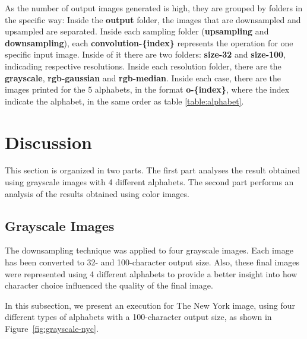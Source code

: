 \documentclass[]{IEEEtran}
\begin{document}
As the number of output images generated is high, they are grouped by folders in the specific way: Inside the \textbf{output} folder, the images that are downsampled and upsampled are separated. Inside each sampling folder (\textbf{upsampling} and \textbf{downsampling}), each \textbf{convolution-\{index\}} represents the operation for one specific input image. Inside of it there are two folders: \textbf{size-32} and \textbf{size-100}, indicading respective resolutions. Inside each resolution folder, there are the \textbf{grayscale}, \textbf{rgb-gaussian} and \textbf{rgb-median}. Inside each case, there are the images printed for the 5 alphabets, in the format \textbf{o-\{index\}}, where the index indicate the alphabet, in the same order as table \ref{table:alphabet}.  

\section{Discussion}

This section is organized in two parts. The first part analyses the result obtained using grayscale images with 4 different alphabets. The second part performs an analysis of the results obtained using color images.

\subsection{Grayscale Images}

The downsampling technique was applied to four grayscale images. Each image has been converted to 32- and 100-character output size. Also, these final images were represented using 4 different alphabets to provide a better insight into how character choice influenced the quality of the final image.

In this subsection, we present an execution for The New York image, using four different types of alphabets with a 100-character output size, as shown in Figure~\ref{fig:grayscale-nyc}.

\end{document}
